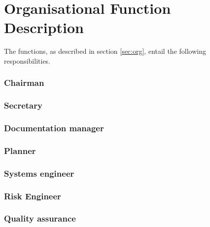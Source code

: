 \section{Organisational Function Description} \label{app:obs}
The functions, as described in section \ref{sec:org}, entail the following responsibilities.

\subsubsection{Chairman}\label{subsec:Chairman}


\subsubsection{Secretary}\label{subsec:Secretary}


\subsubsection{Documentation manager}\label{subsec:D_and_A}


\subsubsection{Planner}\label{subsec:Planner}


\subsubsection{Systems engineer}\label{subsec:SE}


\subsubsection{Risk Engineer}\label{subsec:RiskEng}


\subsubsection{Quality assurance}\label{subsec:QA}




